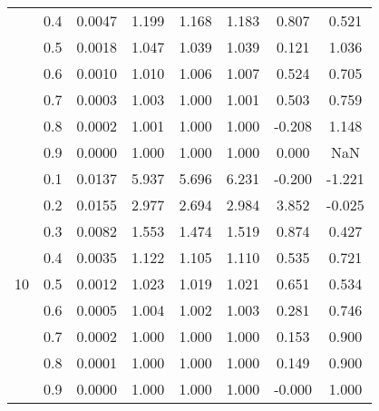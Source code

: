 \documentclass[11pt,a4paper]{report}
\begin{document}
\begin{longtable}{ | c | c || c | c | c | c | c | c | }
 & 0.4 & 0.0047 & 1.199 & 1.168 & 1.183 & 0.807 & 0.521 \\
 & 0.5 & 0.0018 & 1.047 & 1.039 & 1.039 & 0.121 & 1.036 \\
 & 0.6 & 0.0010 & 1.010 & 1.006 & 1.007 & 0.524 & 0.705 \\
 & 0.7 & 0.0003 & 1.003 & 1.000 & 1.001 & 0.503 & 0.759 \\
 & 0.8 & 0.0002 & 1.001 & 1.000 & 1.000 & -0.208 & 1.148 \\
 & 0.9 & 0.0000 & 1.000 & 1.000 & 1.000 & 0.000 & NaN \\
 \hline
\multirow{9}{*}{10} & 0.1 & 0.0137 & 5.937 & 5.696 & 6.231 & -0.200 & -1.221 \\
 & 0.2 & 0.0155 & 2.977 & 2.694 & 2.984 & 3.852 & -0.025 \\
 & 0.3 & 0.0082 & 1.553 & 1.474 & 1.519 & 0.874 & 0.427 \\
 & 0.4 & 0.0035 & 1.122 & 1.105 & 1.110 & 0.535 & 0.721 \\
 & 0.5 & 0.0012 & 1.023 & 1.019 & 1.021 & 0.651 & 0.534 \\
 & 0.6 & 0.0005 & 1.004 & 1.002 & 1.003 & 0.281 & 0.746 \\
 & 0.7 & 0.0002 & 1.000 & 1.000 & 1.000 & 0.153 & 0.900 \\
 & 0.8 & 0.0001 & 1.000 & 1.000 & 1.000 & 0.149 & 0.900 \\
 & 0.9 & 0.0000 & 1.000 & 1.000 & 1.000 & -0.000 & 1.000 \\
 \hline
\hline
\end{longtable}
\end{document}
